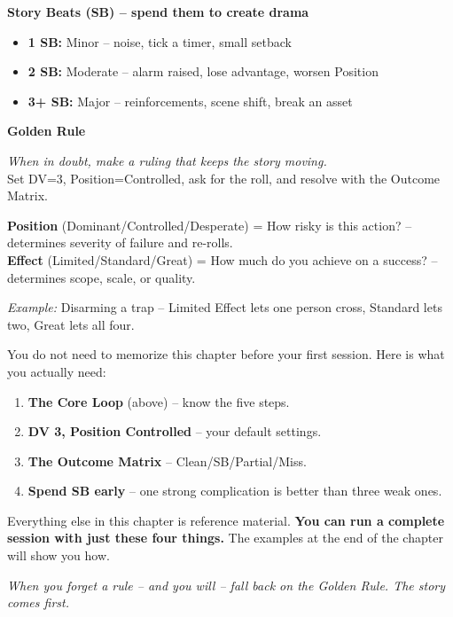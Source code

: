 \begin{tcolorbox}
\medskip
\textbf{Story Beats (SB) -- spend them to create drama}
\begin{itemize}[leftmargin=*, nosep]
  \item \textbf{1 SB:} Minor -- noise, tick a timer, small setback
  \item \textbf{2 SB:} Moderate -- alarm raised, lose advantage, worsen Position
  \item \textbf{3+ SB:} Major -- reinforcements, scene shift, break an asset
\end{itemize}

\medskip
\textbf{Golden Rule}\par
\emph{When in doubt, make a ruling that keeps the story moving.} \\
Set DV=3, Position=Controlled, ask for the roll, and resolve with the Outcome Matrix.

\end{tcolorbox}

\begin{effectbox}
  \textbf{Position} (Dominant/Controlled/Desperate) = How risky is this action? -- determines severity of failure and re-rolls.\\
  \textbf{Effect} (Limited/Standard/Great) = How much do you achieve on a success? -- determines scope, scale, or quality.
  
  \vspace{4pt}
  \small
  \textit{Example:} Disarming a trap -- Limited Effect lets one person cross, Standard lets two, Great lets all four.
\end{effectbox}

\begin{tcolorbox}[
  colback=green!5!white,
  colframe=green!60!black,
  title=\textbf{First-Time GM? Start Here},
  fonttitle=\bfseries\large,
  sharp corners,
  drop shadow,
  before skip=10pt,
  after skip=10pt,
  breakable
]
You do not need to memorize this chapter before your first session. Here is what you actually need:

\begin{enumerate}
  \item \textbf{The Core Loop} (above) -- know the five steps.
  \item \textbf{DV 3, Position Controlled} -- your default settings.
  \item \textbf{The Outcome Matrix} -- Clean/SB/Partial/Miss.
  \item \textbf{Spend SB early} -- one strong complication is better than three weak ones.
\end{enumerate}

Everything else in this chapter is reference material. \textbf{You can run a complete session with just these four things.} The examples at the end of the chapter will show you how.

\medskip
\noindent\textit{When you forget a rule -- and you will -- fall back on the Golden Rule. The story comes first.}
\end{tcolorbox}

